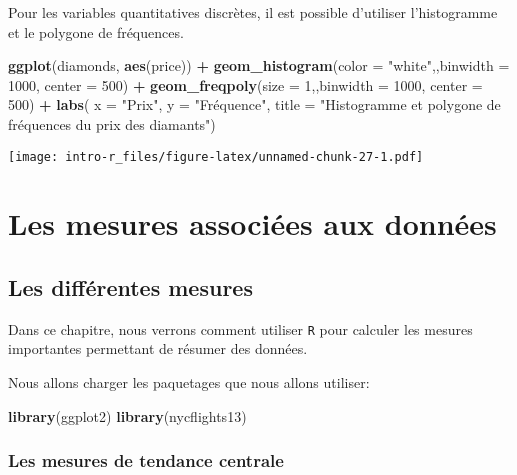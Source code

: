 \documentclass[]{book}
\newenvironment{Shaded}{\begin{snugshade}}{\end{snugshade}}
\newcommand{\KeywordTok}[1]{\textcolor[rgb]{0.13,0.29,0.53}{\textbf{#1}}}
\newcommand{\DataTypeTok}[1]{\textcolor[rgb]{0.13,0.29,0.53}{#1}}
\newcommand{\DecValTok}[1]{\textcolor[rgb]{0.00,0.00,0.81}{#1}}
\newcommand{\StringTok}[1]{\textcolor[rgb]{0.31,0.60,0.02}{#1}}
\newcommand{\OperatorTok}[1]{\textcolor[rgb]{0.81,0.36,0.00}{\textbf{#1}}}
\newcommand{\NormalTok}[1]{#1}
\begin{document}
Pour les variables quantitatives discrètes, il est possible d'utiliser
l'histogramme et le polygone de fréquences.

\begin{Shaded}
\begin{Highlighting}[]
\KeywordTok{ggplot}\NormalTok{(diamonds, }\KeywordTok{aes}\NormalTok{(price)) }\OperatorTok{+}\StringTok{ }
\StringTok{  }\KeywordTok{geom_histogram}\NormalTok{(}\DataTypeTok{color =} \StringTok{"white"}\NormalTok{,,}\DataTypeTok{binwidth =} \DecValTok{1000}\NormalTok{, }\DataTypeTok{center =} \DecValTok{500}\NormalTok{) }\OperatorTok{+}\StringTok{ }
\StringTok{  }\KeywordTok{geom_freqpoly}\NormalTok{(}\DataTypeTok{size =} \DecValTok{1}\NormalTok{,,}\DataTypeTok{binwidth =} \DecValTok{1000}\NormalTok{, }\DataTypeTok{center =} \DecValTok{500}\NormalTok{) }\OperatorTok{+}\StringTok{ }
\StringTok{  }\KeywordTok{labs}\NormalTok{(}
    \DataTypeTok{x =} \StringTok{"Prix"}\NormalTok{, }
    \DataTypeTok{y =} \StringTok{"Fréquence"}\NormalTok{, }
    \DataTypeTok{title =} \StringTok{"Histogramme et polygone de fréquences du prix des diamants"}\NormalTok{)}
\end{Highlighting}
\end{Shaded}

\texttt{[image: intro-r\_files/figure-latex/unnamed-chunk-27-1.pdf]}

\part{Les mesures associées aux
données}\label{part-les-mesures-associees-aux-donnees}

\chapter{Les différentes mesures}\label{les-differentes-mesures}

Dans ce chapitre, nous verrons comment utiliser \texttt{R} pour calculer
les mesures importantes permettant de résumer des données.

Nous allons charger les paquetages que nous allons utiliser:

\begin{Shaded}
\begin{Highlighting}[]
\KeywordTok{library}\NormalTok{(ggplot2)}
\KeywordTok{library}\NormalTok{(nycflights13)}
\end{Highlighting}
\end{Shaded}

\section{Les mesures de tendance
centrale}\label{les-mesures-de-tendance-centrale}
\end{document}

